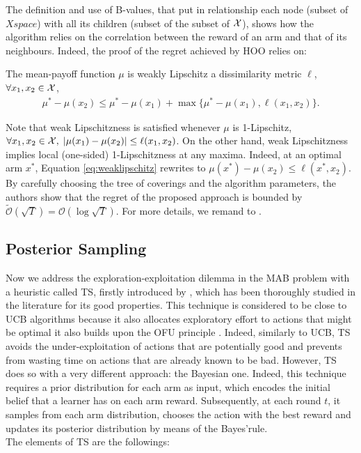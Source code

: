 The definition and use of B-values, that put in relationship each node (subset of $Xspace$) with all its children (subset of the subset of $\mathcal{X}$), shows how the algorithm relies on the correlation between the reward of an arm and that of its neighbours. Indeed, the proof of the regret achieved by \gls{HOO} relies on:

\begin{assumption}
The mean-payoff function $\mu$ is weakly Lipschitz \wrt a dissimilarity metric $\ell$, \ie $\forall x_1,x_2\in\mathcal{X}$,
\begin{align}
\mu^*-\mu(x_2)\leq\mu^* - \mu(x_1)+\max\{\mu^* - \mu(x_1), \ell(x_1,x_2)\}. \label{eq:weaklipschitz}
\end{align}
\end{assumption}

Note that weak Lipschitzness is satisfied whenever $\mu$ is 1-Lipschitz, \ie $\forall x_1,x_2\in\mathcal{X}, \; |\mu(x_1)-\mu(x_2)|\leq\ell(x_1,x_2)$. On the other hand, weak Lipschitzness implies local (one-sided) 1-Lipschitzness at any maxima. Indeed, at an optimal arm $x^*$, Equation \ref{eq:weaklipschitz} rewrites to $\mu(x^*)-\mu(x_2)\leq\ell(x^*,x_2)$. \\
By carefully choosing the tree of coverings and the algorithm parameters, the authors show that the regret of the proposed approach is bounded by $\widetilde{\mathcal{O}}(\sqrt{T}) = \mathcal{O}(\log\sqrt{T})$. For more details, we remand to \cite{bubeck2011x}.



\subsection{Posterior Sampling}
Now we address the exploration-exploitation dilemma in the \gls{MAB} problem with a heuristic called \gls{TS}, firstly introduced by \cite{thompson1933likelihood}, which has been thoroughly studied in the literature for its good properties. This technique is considered to be close to \gls{UCB} algorithms because it also allocates exploratory effort to actions that might be optimal \ie it also builds upon the \gls{OFU} principle \cite{russo2013eluder}. Indeed, similarly to \gls{UCB}, \gls{TS} avoids the under-exploitation of actions that are potentially good and prevents from wasting time on actions that are already known to be bad. However, \gls{TS} does so with a very different approach: the Bayesian one. Indeed, this technique requires a prior distribution for each arm as input, which encodes the initial belief that a learner has on each arm reward. Subsequently, at each round $t$, it samples from each arm distribution, chooses the action with the best reward and updates its posterior distribution by means of the Bayes'rule.\\ The elements of \gls{TS} are the followings:

